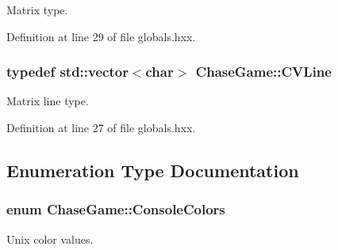 Matrix type. 



Definition at line 29 of file globals.\-hxx.

\hypertarget{namespace_chase_game_aa09cf1806d3b1f59d36cfabadeaca6a2}{
\subsubsection[{C\-V\-Line}]{\setlength{\rightskip}{0pt plus 5cm}typedef std\-::vector$<$char$>$ {\bf Chase\-Game\-::\-C\-V\-Line}}}\label{namespace_chase_game_aa09cf1806d3b1f59d36cfabadeaca6a2}


Matrix line type. 



Definition at line 27 of file globals.\-hxx.



\subsection{Enumeration Type Documentation}
\hypertarget{namespace_chase_game_a5acdf639e912d1e78814b7fae21afc7b}{
\subsubsection[{Console\-Colors}]{\setlength{\rightskip}{0pt plus 5cm}enum {\bf Chase\-Game\-::\-Console\-Colors}}}\label{namespace_chase_game_a5acdf639e912d1e78814b7fae21afc7b}


Unix color values. 


